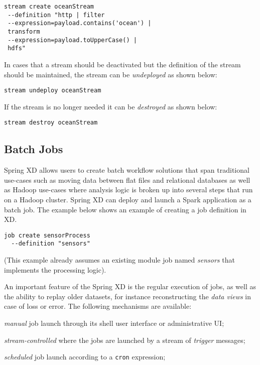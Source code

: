 \begin{lstlisting}
stream create oceanStream
 --definition "http | filter
 --expression=payload.contains('ocean') |
 transform
 --expression=payload.toUpperCase() |
 hdfs"
\end{lstlisting}

In cases that a stream should be deactivated but the definition of the stream
should be maintained, the stream can be \emph{undeployed} as shown below:

\begin{lstlisting}
stream undeploy oceanStream
\end{lstlisting}

If the stream is no longer needed it can be \emph{destroyed} as shown below:

\begin{lstlisting}
stream destroy oceanStream
\end{lstlisting}

\subsection {Batch Jobs}

Spring XD allows users to create batch workflow solutions that span traditional
use-cases such as moving data between flat files and relational databases as
well as Hadoop use-cases where analysis logic is broken up into several steps
that run on a Hadoop cluster. Spring XD can deploy and launch a Spark application
as a batch job.  The example below shows an example of creating a
job definition in XD.

\begin{lstlisting}
job create sensorProcess
  --definition "sensors"
\end{lstlisting}

(This example already assumes an existing module job named \emph{sensors} that
implements the processing logic).

An important feature of the Spring XD is the regular
execution of jobs, as well as the ability to replay older datasets, for
instance reconstructing the \emph{data views} in case of loss or error.
The following mechanisms are available:

\begin{itemize*}
\item \emph{manual} job launch through its shell user interface or
administrative UI;
\item \emph{stream-controlled} where the jobs are launched by a stream of
\emph{trigger} messages;
\item \emph{scheduled} job launch according to a \texttt{cron} expression;
\end{itemize*}

